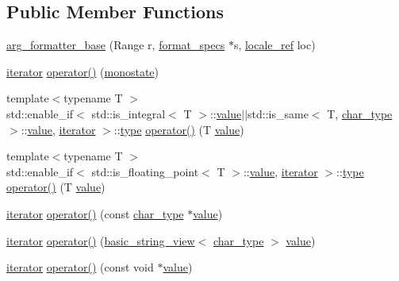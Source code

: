 \subsection*{Public Member Functions}
\begin{DoxyCompactItemize}
\item 
\hyperlink{classinternal_1_1arg__formatter__base_ad70a5b77be0b45b880609cc8fdf1c151}{arg\+\_\+formatter\+\_\+base} (Range r, \hyperlink{classinternal_1_1arg__formatter__base_acff46f7da1afa536210eb77a2ea0d775}{format\+\_\+specs} $\ast$s, \hyperlink{classinternal_1_1locale__ref}{locale\+\_\+ref} loc)
\item 
\hyperlink{classinternal_1_1arg__formatter__base_a87622fdc9716fee6a6de2ae496e3a54f}{iterator} \hyperlink{classinternal_1_1arg__formatter__base_a5fa077fa175a4a91af8a6774f548411f}{operator()} (\hyperlink{structmonostate}{monostate})
\item 
{\footnotesize template$<$typename T $>$ }\\std\+::enable\+\_\+if$<$ std\+::is\+\_\+integral$<$ T $>$\+::\hyperlink{classinternal_1_1value}{value}$\vert$$\vert$std\+::is\+\_\+same$<$ T, \hyperlink{classinternal_1_1arg__formatter__base_a407930bf282880d2ca45dfa8f5d2034b}{char\+\_\+type} $>$\+::\hyperlink{classinternal_1_1value}{value}, \hyperlink{classinternal_1_1arg__formatter__base_a87622fdc9716fee6a6de2ae496e3a54f}{iterator} $>$\+::\hyperlink{namespaceinternal_a8661864098ac0acff9a6dd7e66f59038}{type} \hyperlink{classinternal_1_1arg__formatter__base_a7cf58948dafdb66e977cfadb03176de5}{operator()} (T \hyperlink{classinternal_1_1value}{value})
\item 
{\footnotesize template$<$typename T $>$ }\\std\+::enable\+\_\+if$<$ std\+::is\+\_\+floating\+\_\+point$<$ T $>$\+::\hyperlink{classinternal_1_1value}{value}, \hyperlink{classinternal_1_1arg__formatter__base_a87622fdc9716fee6a6de2ae496e3a54f}{iterator} $>$\+::\hyperlink{namespaceinternal_a8661864098ac0acff9a6dd7e66f59038}{type} \hyperlink{classinternal_1_1arg__formatter__base_ad3ecb94ca4a29768ea6b559ee37be3d3}{operator()} (T \hyperlink{classinternal_1_1value}{value})
\item 
\hyperlink{classinternal_1_1arg__formatter__base_a87622fdc9716fee6a6de2ae496e3a54f}{iterator} \hyperlink{classinternal_1_1arg__formatter__base_a6430303a592b0f1f1abb82dd0a745cc6}{operator()} (const \hyperlink{classinternal_1_1arg__formatter__base_a407930bf282880d2ca45dfa8f5d2034b}{char\+\_\+type} $\ast$\hyperlink{classinternal_1_1value}{value})
\item 
\hyperlink{classinternal_1_1arg__formatter__base_a87622fdc9716fee6a6de2ae496e3a54f}{iterator} \hyperlink{classinternal_1_1arg__formatter__base_a3883b00024fb661ac96cd0e182002ff2}{operator()} (\hyperlink{classbasic__string__view}{basic\+\_\+string\+\_\+view}$<$ \hyperlink{classinternal_1_1arg__formatter__base_a407930bf282880d2ca45dfa8f5d2034b}{char\+\_\+type} $>$ \hyperlink{classinternal_1_1value}{value})
\item 
\hyperlink{classinternal_1_1arg__formatter__base_a87622fdc9716fee6a6de2ae496e3a54f}{iterator} \hyperlink{classinternal_1_1arg__formatter__base_a77a4267b70ae9bd069e6134a7b2af862}{operator()} (const void $\ast$\hyperlink{classinternal_1_1value}{value})
\end{DoxyCompactItemize}
